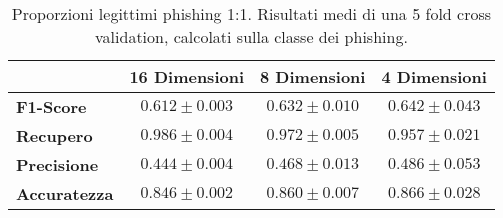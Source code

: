\documentclass[../../main.tex]{subfiles}
\begin{document}
    \begin{table}[H]
        \centering
        \begin{tabular}{lccc}
            \toprule
            {} &                      \textbf{16 Dimensioni} & \textbf{8 Dimensioni} & \textbf{4 Dimensioni} \\
            \midrule
            \textbf{F1-Score }      &      $0.612 \pm 0.003$ & $0.632 \pm 0.010$ & $0.642 \pm 0.043$\\
            \textbf{Recupero   }    &      $0.986 \pm 0.004$ & $0.972 \pm 0.005$ & $0.957 \pm 0.021$\\
            \textbf{Precisione}     &      $0.444 \pm 0.004$ & $0.468 \pm 0.013$ & $0.486 \pm 0.053$\\
            \textbf{Accuratezza }   &      $0.846 \pm 0.002$ & $0.860 \pm 0.007$ & $0.866 \pm 0.028$\\
            \bottomrule
        \end{tabular}     
        \caption{Proporzioni legittimi phishing 1:1. Risultati medi di una 5 fold cross validation, calcolati sulla classe dei phishing.}  
        \label{tab:1a1Undersampling} 
    \end{table}


    
\end{document}
